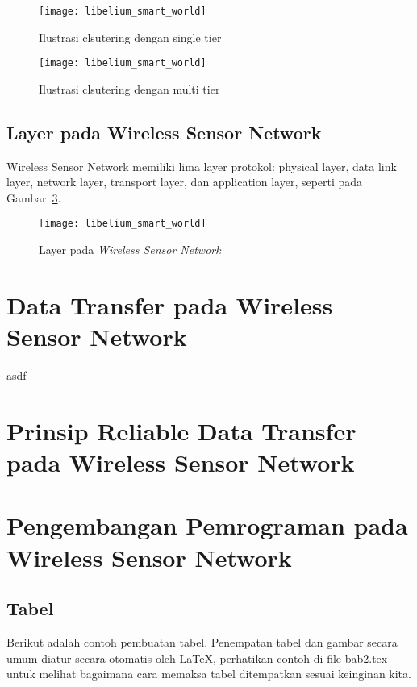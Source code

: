 \begin{figure} [H]
	\centering  
	\texttt{[image: libelium\_smart\_world]}  
	\caption[Ilustrasi clsutering dengan single tier]{Ilustrasi clsutering dengan single tier} 
	\label{fig:libelium_smart_world} 
\end{figure} 
\begin{figure} [H]
	\centering  
	\texttt{[image: libelium\_smart\_world]}  
	\caption[Ilustrasi clsutering dengan multi tier]{Ilustrasi clsutering dengan multi tier} 
	\label{fig:libelium_smart_world} 
\end{figure}

\subsection{Layer pada Wireless Sensor Network}
Wireless Sensor Network memiliki lima layer protokol: physical layer, data link layer, network layer, transport layer, dan application layer, seperti pada Gambar~\ref{fig:libelium_smart_world}. 


\begin{figure} 
	\centering  
	\texttt{[image: libelium\_smart\_world]}  
	\caption[Layer pada \textit{Wireless Sensor Network}]{Layer pada \textit{Wireless Sensor Network}} 
	\label{fig:libelium_smart_world} 
\end{figure} 

\section{Data Transfer pada Wireless Sensor Network} 
asdf
 
\section{Prinsip Reliable Data Transfer pada Wireless Sensor Network}
\label{sec:reliable}

 
\section{Pengembangan Pemrograman pada Wireless Sensor Network}
\label{sec:pemrograman_wsn}


\newpage
\subsection{Tabel}  
Berikut adalah contoh pembuatan tabel. 
Penempatan tabel dan gambar secara umum diatur secara otomatis oleh \LaTeX{}, perhatikan contoh di file bab2.tex untuk melihat bagaimana cara memaksa tabel ditempatkan sesuai keinginan kita.

